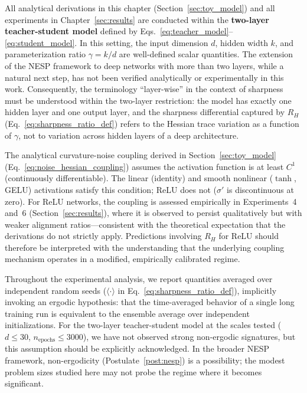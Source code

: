 \documentclass[
  journal=largetwo,
  simfonts=false,
  year=2025,
  volume=37,
]{cup-journal}
\begin{document}
\begin{assumption}\label{assump:two_layer}
All analytical derivations in this chapter (Section~\ref{sec:toy_model}) and all experiments in Chapter~\ref{sec:results} are conducted within the \textbf{two-layer teacher-student model} defined by Eqs.~\eqref{eq:teacher_model}--\eqref{eq:student_model}. In this setting, the input dimension $d$, hidden width $k$, and parameterization ratio $\gamma = k/d$ are well-defined scalar quantities. The extension of the NESP framework to deep networks with more than two layers, while a natural next step, has not been verified analytically or experimentally in this work. Consequently, the terminology ``layer-wise'' in the context of sharpness must be understood within the two-layer restriction: the model has exactly one hidden layer and one output layer, and the sharpness differential captured by $R_H$ (Eq.~\ref{eq:sharpness_ratio_def}) refers to the Hessian trace variation as a function of $\gamma$, not to variation across hidden layers of a deep architecture.
\end{assumption}

\begin{assumption}\label{assump:smooth_activation}
The analytical curvature-noise coupling derived in Section~\ref{sec:toy_model} (Eq.~\ref{eq:noise_hessian_coupling}) assumes the activation function is at least $C^1$ (continuously differentiable). The linear (identity) and smooth nonlinear ($\tanh$, GELU) activations satisfy this condition; ReLU does not ($\sigma'$ is discontinuous at zero). For ReLU networks, the coupling is assessed empirically in Experiments~4 and~6 (Section~\ref{sec:results}), where it is observed to persist qualitatively but with weaker alignment ratios---consistent with the theoretical expectation that the derivations do not strictly apply. Predictions involving $R_H$ for ReLU should therefore be interpreted with the understanding that the underlying coupling mechanism operates in a modified, empirically calibrated regime.
\end{assumption}

\begin{assumption}\label{assump:ergodic}
Throughout the experimental analysis, we report quantities averaged over independent random seeds ($\langle\cdot\rangle$ in Eq.~\ref{eq:sharpness_ratio_def}), implicitly invoking an ergodic hypothesis: that the time-averaged behavior of a single long training run is equivalent to the ensemble average over independent initializations. For the two-layer teacher-student model at the scales tested ($d \leq 30$, $n_{\mathrm{epochs}} \leq 3000$), we have not observed strong non-ergodic signatures, but this assumption should be explicitly acknowledged. In the broader NESP framework, non-ergodicity (Postulate~\ref{post:nesp}) is a possibility; the modest problem sizes studied here may not probe the regime where it becomes significant.
\end{assumption}
\end{document}

